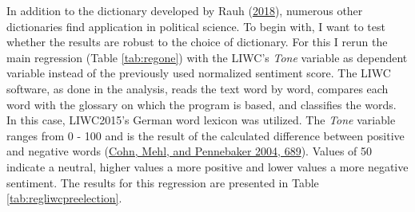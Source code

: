 \documentclass[a4paper,11pt]{article}
\begin{document}
In addition to the dictionary developed by Rauh (\protect\hyperlink{ref-rauhValidatingSentimentDictionary2018}{2018}), numerous other dictionaries find application in political science. To begin with, I want to test whether the results are robust to the choice of dictionary. For this I rerun the main regression (Table \ref{tab:regone}) with the LIWC's \emph{Tone} variable as dependent variable instead of the previously used normalized sentiment score. The LIWC software, as done in the analysis, reads the text word by word, compares each word with the glossary on which the program is based, and classifies the words. In this case, LIWC2015's German word lexicon was utilized. The \emph{Tone} variable ranges from 0 - 100 and is the result of the calculated difference between positive and negative words (\protect\hyperlink{ref-cohnLinguisticMarkersPsychological2004}{Cohn, Mehl, and Pennebaker 2004, 689}). Values of 50 indicate a neutral, higher values a more positive and lower values a more negative sentiment. The results for this regression are presented in Table \ref{tab:regliwcpreelection}.
\end{document}

